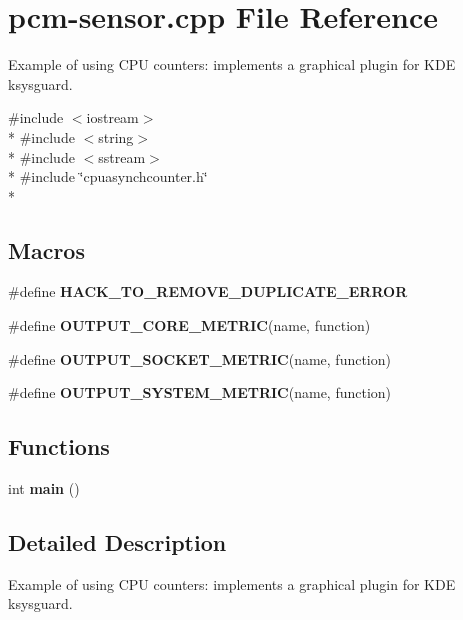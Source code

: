 \section{pcm-\/sensor.cpp File Reference}
\label{pcm-sensor_8cpp}


Example of using C\+PU counters\+: implements a graphical plugin for K\+DE ksysguard.  


{\ttfamily \#include $<$iostream$>$}\\*
{\ttfamily \#include $<$string$>$}\\*
{\ttfamily \#include $<$sstream$>$}\\*
{\ttfamily \#include \char`\"{}cpuasynchcounter.\+h\char`\"{}}\\*
\subsection*{Macros}
\begin{DoxyCompactItemize}
\item 
\#define {\bfseries H\+A\+C\+K\+\_\+\+T\+O\+\_\+\+R\+E\+M\+O\+V\+E\+\_\+\+D\+U\+P\+L\+I\+C\+A\+T\+E\+\_\+\+E\+R\+R\+OR}\label{pcm-sensor_8cpp_ac4eeb11d89b0f517835a12a04443ebe4}

\item 
\#define {\bfseries O\+U\+T\+P\+U\+T\+\_\+\+C\+O\+R\+E\+\_\+\+M\+E\+T\+R\+IC}(name,  function)
\item 
\#define {\bfseries O\+U\+T\+P\+U\+T\+\_\+\+S\+O\+C\+K\+E\+T\+\_\+\+M\+E\+T\+R\+IC}(name,  function)
\item 
\#define {\bfseries O\+U\+T\+P\+U\+T\+\_\+\+S\+Y\+S\+T\+E\+M\+\_\+\+M\+E\+T\+R\+IC}(name,  function)
\end{DoxyCompactItemize}
\subsection*{Functions}
\begin{DoxyCompactItemize}
\item 
int {\bfseries main} ()\label{pcm-sensor_8cpp_ae66f6b31b5ad750f1fe042a706a4e3d4}

\end{DoxyCompactItemize}


\subsection{Detailed Description}
Example of using C\+PU counters\+: implements a graphical plugin for K\+DE ksysguard. 



